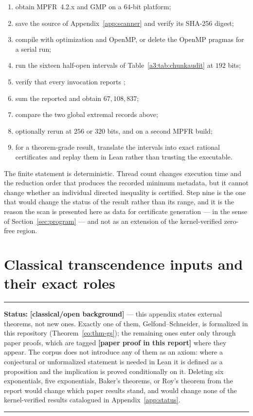 \documentclass[11pt,oneside]{article}
\theoremstyle{definition}
\theoremstyle{remark}
\newcommand{\lean}[1]{\texttt{\detokenize{#1}}}
\newcommand{\statusnew}{\textcolor{newgreen}{\textbf{[paper proof in this report]}}}
\newcommand{\statusknown}{\textcolor{classicalgray}{\textbf{[classical/\allowbreak open background]}}}
\newenvironment{statusbox}[1]
{\begin{center}\begin{minipage}{0.94\textwidth}\raggedright\hbadness=10000\hrule
\vspace{0.45em}\textbf{Status:} #1\par\vspace{0.35em}}
{\vspace{0.35em}\hrule\end{minipage}\end{center}}
\begin{document}
\begin{enumerate}
\item obtain MPFR~4.2.x and GMP on a $64$-bit platform;
\item save the source of Appendix~\ref{app:scanner} and verify its SHA-256 digest;
\item compile with optimization and OpenMP, or delete the OpenMP pragmas for a serial run;
\item run the sixteen half-open intervals of Table~\ref{a3:tab:chunkaudit} at $192$ bits;
\item verify that every invocation reports \lean{failures=0};
\item sum the reported \lean{checked_nonpowers} and obtain $67{,}108{,}837$;
\item compare the two global extremal records above;
\item optionally rerun at $256$ or $320$ bits, and on a second MPFR build;
\item for a theorem-grade result, translate the intervals into exact rational certificates and
replay them in Lean rather than trusting the executable.
\end{enumerate}

The finite statement is deterministic.  Thread count changes execution time and the reduction
order that produces the recorded minimum metadata, but it cannot change whether an individual
directed inequality is certified.  Step nine is the one that would change the status of the
result rather than its range, and it is the reason the scan is presented here as data for
certificate generation --- in the sense of Section~\ref{sec:program} --- and not as an
extension of the kernel-verified zero-free region.

\section{Classical transcendence inputs and their exact roles}\label{app:classical}

\begin{statusbox}{\statusknown{} --- this appendix states external theorems, not new ones.
Exactly one of them, Gelfond--Schneider, is formalized in this repository
(Theorem~\ref{co:thm-gs}); the remaining ones enter only through paper proofs, which are
tagged \statusnew{} where they appear.  The corpus does not introduce any of them as an
axiom: where a conjectural or unformalized statement is needed in Lean it is defined as a
proposition and the implication is proved conditionally on it.  Deleting six exponentials,
five exponentials, Baker's theorems, or Roy's theorem from the report would change which
paper results stand, and would change none of the kernel-verified results catalogued in
Appendix~\ref{app:status}.}
\end{statusbox}
\end{document}
